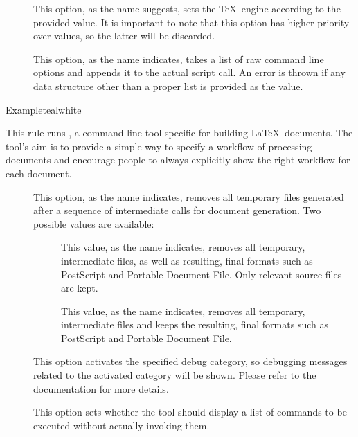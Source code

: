 \begin{description}
\begin{description}
\item[] This option, as the name suggests, sets the \TeX\ engine according to the provided value. It is important to note that this option has higher priority over  values, so the latter will be discarded.

\item[] This option, as the name indicates, takes a list of raw command line options and appends it to the actual script call. An error is thrown if any data structure other than a proper list is provided as the value.
\end{description}

\begin{codebox}{Example}{teal}{\icnote}{white}
\end{codebox}

\item[\rulebox{llmk}]
This rule runs , a command line tool specific for building \LaTeX\ documents. The tool's aim is to provide a simple way to specify a workflow of processing documents and encourage people to always explicitly show the right workflow for each document.

\begin{description}
\item[] This option, as the name indicates, removes all temporary files generated after a sequence of intermediate calls for document generation. Two possible values are available:

\begin{description}
\item[] This value, as the name indicates, removes all temporary, intermediate files, as well as resulting, final formats such as PostScript and Portable Document File. Only relevant source files are kept.

\item[] This value, as the name indicates, removes all temporary, intermediate files and keeps the resulting, final formats such as PostScript and Portable Document File.
\end{description}

\item[] This option activates the specified debug category, so debugging messages related to the activated category will be shown. Please refer to the documentation for more details.

\item[] This option sets whether the tool should display a list of commands to be executed without actually invoking them.


\end{description}
\end{description}
